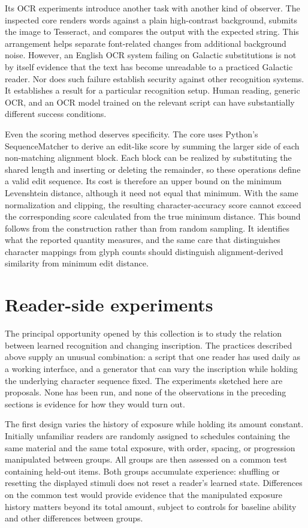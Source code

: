 \documentclass[11pt]{article}
\begin{document}
Its OCR experiments introduce another task with another kind of observer. The inspected core renders words against a plain high-contrast background, submits the image to Tesseract, and compares the output with the expected string. This arrangement helps separate font-related changes from additional background noise. However, an English OCR system failing on Galactic substitutions is not by itself evidence that the text has become unreadable to a practiced Galactic reader. Nor does such failure establish security against other recognition systems. It establishes a result for a particular recognition setup. Human reading, generic OCR, and an OCR model trained on the relevant script can have substantially different success conditions.

Even the scoring method deserves specificity. The core uses Python's SequenceMatcher to derive an edit-like score by summing the larger side of each non-matching alignment block. Each block can be realized by substituting the shared length and inserting or deleting the remainder, so these operations define a valid edit sequence. Its cost is therefore an upper bound on the minimum Levenshtein distance, although it need not equal that minimum. With the same normalization and clipping, the resulting character-accuracy score cannot exceed the corresponding score calculated from the true minimum distance. This bound follows from the construction rather than from random sampling. It identifies what the reported quantity measures, and the same care that distinguishes character mappings from glyph counts should distinguish alignment-derived similarity from minimum edit distance.

\section{Reader-side experiments}

The principal opportunity opened by this collection is to study the relation between learned recognition and changing inscription. The practices described above supply an unusual combination: a script that one reader has used daily as a working interface, and a generator that can vary the inscription while holding the underlying character sequence fixed. The experiments sketched here are proposals. None has been run, and none of the observations in the preceding sections is evidence for how they would turn out.

The first design varies the history of exposure while holding its amount constant. Initially unfamiliar readers are randomly assigned to schedules containing the same material and the same total exposure, with order, spacing, or progression manipulated between groups. All groups are then assessed on a common test containing held-out items. Both groups accumulate experience: shuffling or resetting the displayed stimuli does not reset a reader's learned state. Differences on the common test would provide evidence that the manipulated exposure history matters beyond its total amount, subject to controls for baseline ability and other differences between groups.
\end{document}

